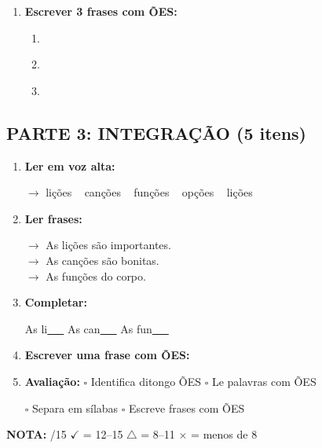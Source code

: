 \begin{exercicio}
\begin{enumerate}[resume]
  \item \textbf{Escrever 3 frases com ÕES:}
  \begin{enumerate}[label=\alph*)]
    \item \underline{\hspace{8cm}}
    \item \underline{\hspace{8cm}}
    \item \underline{\hspace{8cm}}
  \end{enumerate}
\end{enumerate}

\subsection*{PARTE 3: INTEGRAÇÃO (5 itens)}

\begin{enumerate}[resume]
  \item \textbf{Ler em voz alta:}
  \begin{center}
  $\rightarrow$ lições  ~  canções  ~  funções  ~  opções  ~  lições
  \end{center}

  \item \textbf{Ler frases:}
  \begin{center}
  $\rightarrow$ As lições são importantes.\\
  $\rightarrow$ As canções são bonitas.\\
  $\rightarrow$ As funções do corpo.
  \end{center}

  \item \textbf{Completar:}
  \begin{center}
  As li\underline{~~~} \quad As can\underline{~~~} \quad As fun\underline{~~~}
  \end{center}

  \item \textbf{Escrever uma frase com ÕES:}
  \begin{center}
  \underline{\hspace{12cm}}
  \end{center}

  \item \textbf{Avaliação:} $\square$ Identifica ditongo ÕES \quad $\square$ Le palavras com ÕES
  \begin{center}
  $\square$ Separa em sílabas \quad $\square$ Escreve frases com ÕES
  \end{center}
\end{enumerate}

\noindent\textbf{NOTA:} \underline{\hspace{1cm}}/15 \quad $\checkmark$ = 12--15 \quad $\triangle$ = 8--11 \quad $\times$ = menos de 8
\end{exercicio}

